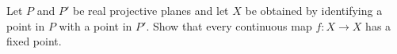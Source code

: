 Let $P$ and $P'$ be real projective planes and let $X$ be obtained by
identifying a point in $P$ with a point in $P'$. Show that every
continuous map $f:X\rightarrow X$ has a fixed point.
